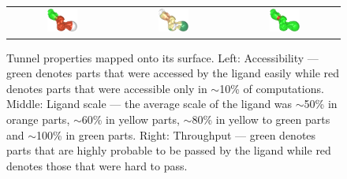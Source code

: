 \documentclass{svmult}
\newcommand{\tylde}{$\sim$}
\begin{document}
\begin{figure}
\centering
\begin{tabular}{ccc}
\includegraphics[width=0.3\textwidth]{fig/accessibility}
\quad & \quad
\includegraphics[width=0.3\textwidth]{fig/ligand-scale}
\quad & \quad
\includegraphics[width=0.3\textwidth]{fig/throughput}
\end{tabular}
\caption{Tunnel properties mapped onto its surface.
Left: Accessibility --- green denotes parts that were accessed by the ligand easily while red denotes parts that were accessible only in \tylde 10\% of computations.
Middle: Ligand scale --- the average scale of the ligand was \tylde 50\% in orange parts, \tylde 60\% in yellow parts, \tylde 80\% in yellow to green parts and \tylde 100\% in green parts.
Right: Throughput --- green denotes parts that are highly probable to be passed by the ligand while red denotes those that were hard to pass.}
\label{fig:properties}
\end{figure}
\end{document}

